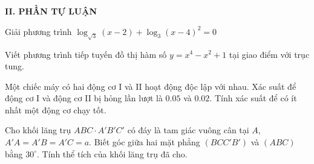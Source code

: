 \noindent\textbf{II. PHẦN TỰ LUẬN}
\begin{ex}
Giải phương trình $\log_{\sqrt{3}}\left( x-2 \right)+\log_{3} \left( x-4 \right)^{2}=0$
\end{ex}
\begin{ex}
Viết phương trình tiếp tuyến đồ thị hàm số $y=x^4-x^2+1$ tại giao điểm với trục tung.
\end{ex}
\begin{ex}
Một chiếc máy có hai động cơ I và II hoạt động độc lập với nhau. Xác suất để động cơ I và động cơ II bị hỏng lần lượt là $0.05$ và $0.02$. Tính xác suất để có ít nhất một động cơ chạy tốt.
\end{ex}
\begin{ex}
Cho khối lăng trụ $ABC \cdot A'B'C'$ có đáy là tam giác vuông cân tại $A$, $A'A=A'B=A'C=a$. Biết góc giữa hai mặt phẳng $\left(BCC'B'\right)$ và $(ABC)$ bằng $30^\circ $. Tính thể tích của khối lăng trụ đã cho.
\end{ex}


